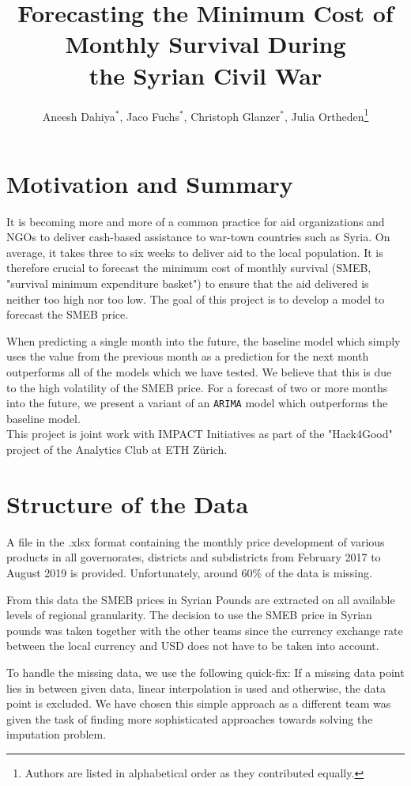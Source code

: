 \documentclass[11pt,a4paper]{article}
\title{Forecasting the Minimum Cost of Monthly Survival During\\the Syrian Civil War}
\author{Aneesh Dahiya${}^\ast$, Jaco Fuchs${}^\ast$, Christoph Glanzer${}^\ast$, Julia Ortheden\thanks{Authors are listed in alphabetical order as they contributed equally.}}
\date{}
\begin{document}
	\maketitle
	
	\section*{Motivation and Summary}
	It is becoming more and more of a common practice for aid organizations and NGOs to deliver cash-based assistance to war-town countries such as Syria. On average, it takes three to six weeks to deliver aid to the local population. It is therefore crucial to forecast the minimum cost of monthly survival (SMEB, "survival minimum expenditure basket") to ensure that the aid delivered is neither too high nor too low. The goal of this project is to develop a model to forecast the SMEB price. 
	
	When predicting a single month into the future, the baseline model which simply uses the value from the previous month as a prediction for the next month outperforms all of the models which we have tested. We believe that this is due to the high volatility of the SMEB price. For a forecast of two or more months into the future, we present a variant of an \texttt{ARIMA} model which outperforms the baseline model.\\
	
	This project is joint work with IMPACT Initiatives as part of the "Hack4Good" project of the Analytics Club at ETH Zürich.
	
	\section*{Structure of the Data}
	A file in the .xlsx format containing the monthly price development of various products in all governorates, districts and subdistricts from February 2017 to August 2019 is provided. Unfortunately, around 60\% of the data is missing.
	
	From this data the SMEB prices in Syrian Pounds are extracted on all available levels of regional granularity. The decision to use the SMEB price in Syrian pounds was taken together with the other teams since the currency exchange rate between the local currency and USD does not have to be taken into account.
	
	To handle the missing data, we use the following quick-fix: If a missing data point lies in between given data, linear interpolation is used and otherwise, the data point is excluded. We have chosen this simple approach as a different team was given the task of finding more sophisticated approaches towards solving the imputation problem.
	
\end{document}

